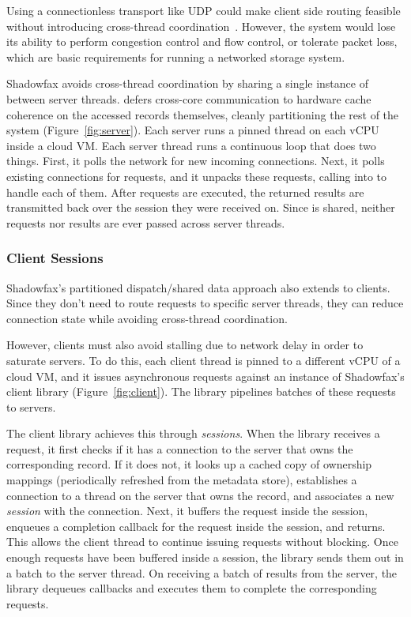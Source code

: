 Using a connectionless transport like UDP could make client side routing
feasible without introducing cross-thread coordination~\cite{fb-memcache,mica}.
%
However, the system would lose its ability to perform congestion
control and flow control, or tolerate packet loss, which
are basic requirements for running a
networked storage system.

Shadowfax avoids cross-thread coordination by sharing a single
instance of \faster between server threads.
%
\faster defers cross-core communication to hardware cache coherence on the
accessed records themselves, cleanly partitioning the rest of the system
(Figure~\ref{fig:server}).
%
Each server runs a pinned thread on each vCPU inside a cloud VM.
%
Each server thread runs a continuous loop that does two things.
%
First, it polls the network for new incoming connections.
%
Next, it polls existing connections for requests, and it unpacks these
requests, calling into \faster to handle each of them.
%
After requests are executed, the returned results are
transmitted back over the session they were received on.
%
Since \faster is shared, neither requests nor results are ever passed across
server threads.

\subsubsection{Client Sessions}
\label{sec:sessions}

Shadowfax's partitioned dispatch/shared data approach also extends to
clients.
%
Since they don't need to route requests to specific server threads, they
can reduce connection state while avoiding cross-thread coordination.

However, clients must also avoid stalling due to network delay in order to
saturate servers.
%
To do this, each client thread is pinned to a different vCPU of a cloud VM,
and it issues asynchronous requests against an instance of
Shadowfax's client library (Figure~\ref{fig:client}).
%
The library pipelines batches of these requests to servers.

The client library achieves this through \emph{sessions}.
%
When the library receives a request, it first checks if it has a
connection to the server that owns the corresponding record.
%
If it does not, it looks up a cached copy of ownership mappings
(periodically refreshed from the metadata store), establishes a
connection to a thread on the server that owns the record, and
associates a new \emph{session} with the connection.
%
Next, it buffers the request inside the session, enqueues a
completion callback for the request inside the session, and returns.
%
This allows the client thread to continue issuing requests without
blocking.
%
Once enough requests have been buffered inside a session, the
library sends them out in a batch to the server thread.
%
On receiving a batch of results from the server, the library
dequeues callbacks and executes them to complete the corresponding
requests.

